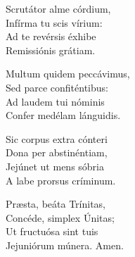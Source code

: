 Scrutátor alme córdium,\\
Infírma tu scis vírium:\\
Ad te revérsis éxhibe\\
Remissiónis grátiam.

Multum quidem peccávimus,\\
Sed parce confiténtibus:\\
Ad laudem tui nóminis\\
Confer medélam lánguidis.

Sic corpus extra cónteri\\
Dona per abstinéntiam,\\
Jejúnet ut mens sóbria\\
A labe prorsus críminum.

Præsta, beáta Trínitas,\\
Concéde, simplex Únitas;\\
Ut fructuósa sint tuis\\
Jejuniórum múnera.
Amen.